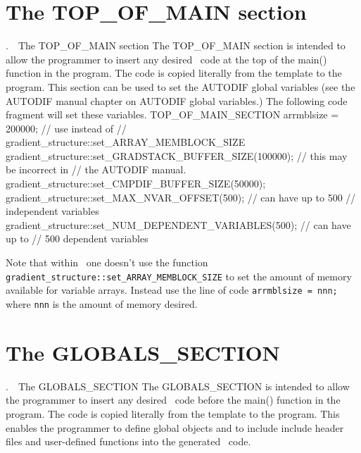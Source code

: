 \documentclass[12pt]{book}
\makeatletter
\def\mysection#1{\section{#1}{\bigbf \medbreak\noindent\number\c@chapter.\number\c@section\ \ #1\medbreak}}
\makeatother
\begin{document}
\htmlnewfile
{}
\mysection{The TOP\_OF\_MAIN section}
The TOP\_OF\_MAIN section is intended to allow the programmer to insert any desired
\cplus\ code at the top of the main() function in the program. The code is copied
literally from the template to the program.  This section can be used to set
the AUTODIF global variables (see the AUTODIF manual chapter on
AUTODIF global variables.)  The following code fragment will set these
variables.
\beginexample
TOP_OF_MAIN_SECTION
  arrmblsize = 200000; // use instead of 
                   // gradient_structure::set_ARRAY_MEMBLOCK_SIZE
  gradient_structure::set_GRADSTACK_BUFFER_SIZE(100000); // this may be incorrect in 
                                       // the AUTODIF manual.
  gradient_structure::set_CMPDIF_BUFFER_SIZE(50000); 
  gradient_structure::set_MAX_NVAR_OFFSET(500); // can have up to 500 
                                             // independent variables
  gradient_structure::set_NUM_DEPENDENT_VARIABLES(500); // can have up to 
                                          // 500 dependent variables
\endexample
{}

Note that within \ADM\ one doesn't use the function
{\tt gradient\_structure::set\_ARRAY\_MEMBLOCK\_SIZE} to set the amount of memory available
for variable arrays. Instead use the line of code {\tt arrmblsize = nnn;}
where {\tt nnn} is the amount of memory desired.

\mysection{The GLOBALS\_SECTION}
The GLOBALS\_SECTION is intended to allow the programmer to insert any desired
\cplus\ code before the  main() function in the program. The code is copied
literally from the template to the program. This enables the programmer to define
global objects and to include include header files and user-defined functions into
the generated \cplus\ code.
\end{document}
